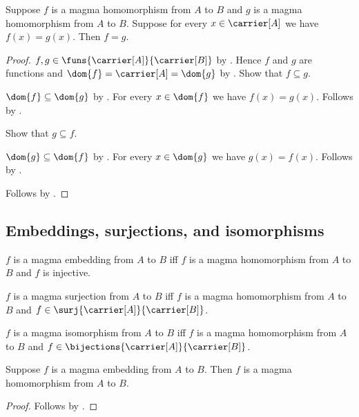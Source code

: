 \begin{theorem}\label{magma_hom_extensionality}
    Suppose $f$ is a magma homomorphism from $A$ to $B$ and
        $g$ is a magma homomorphism from $A$ to $B$.
    Suppose for every $x\in\carrier[A]$ we have $f(x)=g(x)$.
    Then $f=g$.
\end{theorem}
\begin{proof}
    $f,g\in\funs{\carrier[A]}{\carrier[B]}$ by
        .
    Hence $f$ and $g$ are functions and
        $\dom{f}=\carrier[A]=\dom{g}$ by
        .
    Show that $f\subseteq g$.
    \begin{subproof}
        $\dom{f}\subseteq\dom{g}$ by .
        For every $x\in\dom{f}$ we have $f(x)=g(x)$.
        Follows by .
    \end{subproof}
    Show that $g\subseteq f$.
    \begin{subproof}
        $\dom{g}\subseteq\dom{f}$ by .
        For every $x\in\dom{g}$ we have $g(x)=f(x)$.
        Follows by .
    \end{subproof}
    Follows by .
\end{proof}

\subsection{Embeddings, surjections, and isomorphisms}

\begin{definition}\label{magma_embedding}
    $f$ is a magma embedding from $A$ to $B$ iff
        $f$ is a magma homomorphism from $A$ to $B$ and
        $f$ is injective.
\end{definition}

\begin{definition}\label{magma_surjection}
    $f$ is a magma surjection from $A$ to $B$ iff
        $f$ is a magma homomorphism from $A$ to $B$ and
        $f\in\surj{\carrier[A]}{\carrier[B]}$.
\end{definition}

\begin{definition}\label{magma_isomorphism}
    $f$ is a magma isomorphism from $A$ to $B$ iff
        $f$ is a magma homomorphism from $A$ to $B$ and
        $f\in\bijections{\carrier[A]}{\carrier[B]}$.
\end{definition}

\begin{proposition}\label{magma_embedding_is_hom}
    Suppose $f$ is a magma embedding from $A$ to $B$.
    Then $f$ is a magma homomorphism from $A$ to $B$.
\end{proposition}
\begin{proof}
    Follows by .
\end{proof}

